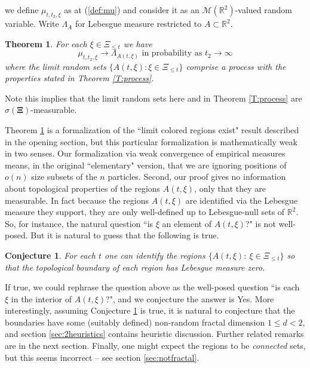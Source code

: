 \documentclass[12pt]{article}
\newtheorem{Theorem}[Lemma]{Theorem}
\newtheorem{Conjecture}[Lemma]{Conjecture}
\newcommand{\MM}{\mbox{${\mathcal M}$}}
\newcommand{\Reals}{{\mathbb{R}}}
\begin{document}
we define $\mu_{t,t_2,\xi}$ as at (\ref{def:mu}) and consider it as an $\MM(\Reals^2)$-valued random variable. 
Write  $\Lambda_A$ for Lebesgue measure restricted to $A \subset \Reals^2$.
\begin{Theorem}
\label{T:limit}
For each $\xi \in \Xi_{\le t}$ we have 
\[ \mu_{t,t_2,\xi} \to \Lambda_{A(t,\xi)} \mbox{ in probability as } t_2 \to \infty \]
where the limit random sets $\{A(t, \xi) : \xi \in \Xi_{\le t} \}$ 
comprise a process with the properties stated in Theorem \ref{T:process}.
\end{Theorem}
Note this implies that the limit random sets here and in Theorem \ref{T:process} are $\sigma(\bm{\Xi})$-measurable.




Theorem \ref{T:limit} is a formalization of the  
 ``limit colored regions exist" result described in the opening section, but this particular formalization is mathematically weak in two senses.
Our formalization via weak convergence of empirical measures means, in the original ``elementary" version, that we are ignoring 
positions of $o(n)$ size subsets of the $n$ particles.  
Second, our proof gives no information about topological properties of the 
regions
$A(t,\xi)$, only that they are measurable.
In fact because the regions $A(t,\xi)$ are identified via the Lebesgue measure they support, they are only well-defined 
up to Lebesgue-null sets of $\Reals^2$.  So, for instance, the natural question 
``is $\xi$ an element of  $A(t,\xi)$?" is not well-posed.
But it is natural to  guess that the following is true.
\begin{Conjecture}
\label{C:1}
For each $t$ one can identify the regions $\{A(t,\xi): \ \xi \in \Xi_{\le t} \}$ so that the topological boundary of each region has Lebesgue measure zero.
\end{Conjecture}
If true, we could rephrase the question above as the well-posed question 
``is each $\xi$ in the interior of  $A(t,\xi)$?", 
and we conjecture the answer is Yes. 
More interestingly, assuming Conjecture \ref{C:1} is true, it is natural to conjecture that the boundaries have some (suitably defined) 
non-random fractal dimension $1 \le d < 2$, and section \ref{sec:2heuristics}  contains heuristic discussion.
Further related remarks are in the next section.
Finally, one might expect the regions to be {\em connected} sets, but this seems incorrect --  
see section \ref{sec:notfractal}.
 
\end{document}
